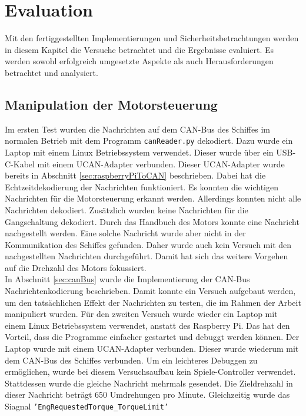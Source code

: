 \chapter{Evaluation}

Mit den fertiggestellten Implementierungen und Sicherheitsbetrachtungen werden in diesem Kapitel die
Versuche betrachtet und die Ergebnisse evaluiert. Es werden sowohl erfolgreich umgesetzte Aspekte als auch
Herausforderungen betrachtet und analysiert.

\section{Manipulation der Motorsteuerung} \label{sec:evManipulationMotor}
Im ersten Test wurden die Nachrichten auf dem CAN-Bus des Schiffes im normalen Betrieb mit dem Programm \texttt{canReader.py} 
dekodiert. Dazu wurde ein Laptop mit einem Linux Betriebssystem verwendet. Dieser wurde über ein USB-C-Kabel mit einem 
UCAN-Adapter verbunden. Dieser UCAN-Adapter wurde bereits in Abschnitt \ref{sec:raspberryPiToCAN} beschrieben. 
Dabei hat die Echtzeitdekodierung der Nachrichten funktioniert. Es konnten die wichtigen Nachrichten für die Motorsteuerung
erkannt werden. Allerdings konnten nicht alle Nachrichten dekodiert. Zusätzlich wurden keine Nachrichten für die Gangschaltung
dekodiert. Durch das Handbuch
des Motors konnte eine Nachricht nachgestellt werden. Eine solche Nachricht wurde aber nicht in der Kommunikation des 
Schiffes gefunden. Daher wurde auch kein Versuch mit den nachgestellten Nachrichten durchgeführt. Damit hat sich 
das weitere Vorgehen auf die Drehzahl des Motors fokussiert. \\
In Abschnitt \ref{sec:canBus} wurde die Implementierung der CAN-Bus Nachrichtenkodierung beschrieben. 
Damit konnte ein Versuch
aufgebaut werden, um den tatsächlichen Effekt der Nachrichten zu testen, die im Rahmen der Arbeit manipuliert wurden. 
Für den zweiten Versuch wurde wieder ein Laptop mit einem Linux Betriebssystem verwendet, anstatt des Raspberry Pi. 
Das hat den Vorteil, dass
die Programme einfacher gestartet und debuggt werden können. Der Laptop wurde mit einem UCAN-Adapter verbunden.  
Dieser wurde wiederum mit dem CAN-Bus des Schiffes verbunden. Um ein leichteres Debuggen zu ermöglichen, wurde bei diesem 
Versuchsaufbau kein Spiele-Controller verwendet. Stattdessen wurde die gleiche Nachricht mehrmals gesendet. Die Zieldrehzahl in 
dieser Nachricht beträgt 650 Umdrehungen pro Minute. Gleichzeitig wurde das Siagnal \texttt{'EngRequestedTorque\_TorqueLimit'} 
